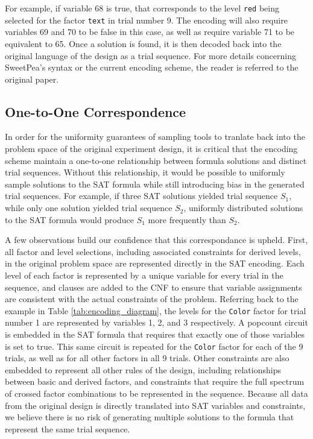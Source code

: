 For example, if variable 68 is true, that corresponds to the level \texttt{red} being selected for the factor \texttt{text} in trial number 9. The encoding will also require variables 69 and 70 to be false in this case, as well as require variable 71 to be equivalent to 65. Once a solution is found, it is then decoded back into the original language of the design as a trial sequence. For more details concerning SweetPea's syntax or the current encoding scheme, the reader is referred to the original paper.

\subsection{One-to-One Correspondence}

In order for the uniformity guarantees of sampling tools to tranlate back into the problem space of the original experiment design, it is critical that the encoding scheme maintain a one-to-one relationship between formula solutions and distinct trial sequences. Without this relationship, it would be possible to uniformly sample solutions to the SAT formula while still introducing bias in the generated trial sequences. For example, if three SAT solutions yielded trial sequence $S_1$, while only one solution yielded trial sequence $S_2$, uniformly distributed solutions to the SAT formula would produce $S_1$ more frequently than $S_2$.

A few observations build our confidence that this correspondance is upheld. First, all factor and level selections, including associated constraints for derived levels, in the original problem space are represented directly in the SAT encoding. Each level of each factor is represented by a unique variable for every trial in the sequence, and clauses are added to the CNF to ensure that variable assignments are consistent with the actual constraints of the problem. Referring back to the example in Table \ref{tab:encoding_diagram}, the levels for the \texttt{Color} factor for trial number 1 are represented by variables 1, 2, and 3 respectively. A popcount circuit is embedded in the SAT formula that requires that exactly one of those variables is set to true. This same circuit is repeated for the \texttt{Color} factor for each of the 9 trials, as well as for all other factors in all 9 trials. Other constraints are also embedded to represent all other rules of the design, including relationships between basic and derived factors, and constraints that require the full spectrum of crossed factor combinations to be represented in the sequence. Because all data from the original design is directly translated into SAT variables and constraints, we believe there is no risk of generating multiple solutions to the formula that represent the same trial sequence.

